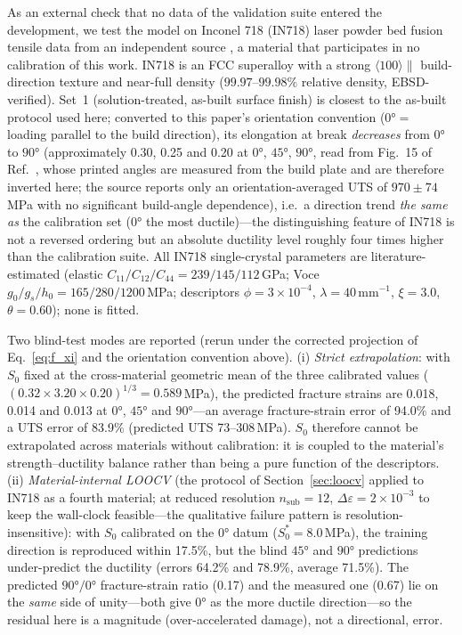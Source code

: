 \documentclass[12pt,a4paper,twocolumn]{article}
\begin{document}
As an external check that no data of the validation suite entered the development, we test the model on Inconel 718 (IN718) laser powder bed fusion tensile data from an independent source \cite{hovig2018in718}, a material that participates in no calibration of this work. IN718 is an FCC superalloy with a strong $\langle100\rangle\parallel$ build-direction texture and near-full density ($99.97$--$99.98\%$ relative density, EBSD-verified). Set~1 (solution-treated, as-built surface finish) is closest to the as-built protocol used here; converted to this paper's orientation convention ($\ang{0} =$ loading parallel to the build direction), its elongation at break \emph{decreases} from $\ang{0}$ to $\ang{90}$ (approximately 0.30, 0.25 and 0.20 at $\ang{0}$, $\ang{45}$, $\ang{90}$, read from Fig.~15 of Ref.~\cite{hovig2018in718}, whose printed angles are measured from the build plate and are therefore inverted here; the source reports only an orientation-averaged UTS of $970\pm74$\,MPa with no significant build-angle dependence), i.e.\ a direction trend \emph{the same as} the calibration set ($\ang{0}$ the most ductile)---the distinguishing feature of IN718 is not a reversed ordering but an absolute ductility level roughly four times higher than the calibration suite. All IN718 single-crystal parameters are literature-estimated (elastic $C_{11}/C_{12}/C_{44} = 239/145/112$\,GPa; Voce $g_0/g_s/h_0 = 165/280/1200$\,MPa; descriptors $\phi = 3\times10^{-4}$, $\lambda = 40$\,mm$^{-1}$, $\xi = 3.0$, $\theta = 0.60$); none is fitted.

Two blind-test modes are reported (rerun under the corrected projection of Eq.~\eqref{eq:f_xi} and the orientation convention above). (i) \emph{Strict extrapolation}: with $S_0$ fixed at the cross-material geometric mean of the three calibrated values ($(0.32\times3.20\times0.20)^{1/3} = 0.589$\,MPa), the predicted fracture strains are 0.018, 0.014 and 0.013 at $\ang{0}$, $\ang{45}$ and $\ang{90}$---an average fracture-strain error of 94.0\% and a UTS error of 83.9\% (predicted UTS 73--308\,MPa). $S_0$ therefore cannot be extrapolated across materials without calibration: it is coupled to the material's strength--ductility balance rather than being a pure function of the descriptors. (ii) \emph{Material-internal LOOCV} (the protocol of Section~\ref{sec:loocv} applied to IN718 as a fourth material; at reduced resolution $n_{\mathrm{sub}}=12$, $\Delta\varepsilon = 2\times10^{-3}$ to keep the wall-clock feasible---the qualitative failure pattern is resolution-insensitive): with $S_0$ calibrated on the $\ang{0}$ datum ($S_0^* = 8.0$\,MPa), the training direction is reproduced within 17.5\%, but the blind $\ang{45}$ and $\ang{90}$ predictions under-predict the ductility (errors 64.2\% and 78.9\%, average 71.5\%). The predicted $\ang{90}/\ang{0}$ fracture-strain ratio (0.17) and the measured one (0.67) lie on the \emph{same} side of unity---both give $\ang{0}$ as the more ductile direction---so the residual here is a magnitude (over-accelerated damage), not a directional, error.
\end{document}
